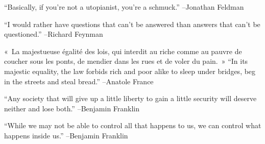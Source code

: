 \documentclass{article}%
\begin{document}
\begin{minipage}{\textwidth}%
\flushleft%
“Basically, if you're not a utopianist, you're a schmuck.”%
\linebreak%
\vspace{1mm}%
–Jonathan Feldman%
\linebreak%
\vspace{1mm}%
\end{minipage}%
\linebreak%
\vspace{1mm}%
\begin{minipage}{\textwidth}%
\flushleft%
“I would rather have questions that can't be answered than answers that can't be questioned.”%
\linebreak%
\vspace{1mm}%
–Richard Feynman%
\linebreak%
\vspace{1mm}%
\end{minipage}%
\linebreak%
\vspace{1mm}%
\begin{minipage}{\textwidth}%
\flushleft%
«~La majestueuse égalité des lois, qui interdit au riche comme au pauvre de coucher sous les ponts, de mendier dans les rues et de voler du pain.~»%
\linebreak%
\vspace{1mm}%
“In its majestic equality, the law forbids rich and poor alike to sleep under bridges, beg in the streets and steal bread.”%
\linebreak%
–Anatole France%
\linebreak%
\vspace{1mm}%
\end{minipage}%
\linebreak%
\vspace{1mm}%
\begin{minipage}{\textwidth}%
\flushleft%
“Any society that will give up a little liberty to gain a little security will deserve neither and lose both.”%
\linebreak%
\vspace{1mm}%
–Benjamin Franklin%
\linebreak%
\vspace{1mm}%
\end{minipage}%
\linebreak%
\vspace{1mm}%
\begin{minipage}{\textwidth}%
\flushleft%
“While we may not be able to control all that happens to us, we can control what happens inside us.”%
\linebreak%
\vspace{1mm}%
–Benjamin Franklin%
\linebreak%
\vspace{1mm}%
\end{minipage}%
\end{document}
